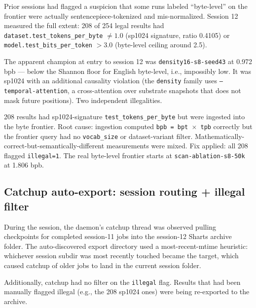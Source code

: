 Prior sessions had flagged a suspicion that some runs labeled ``byte-level'' on the frontier were actually sentencepiece-tokenized and mis-normalized. Session 12 measured the full extent: 208 of 254 legal results had \texttt{dataset.test\_tokens\_per\_byte} $\neq 1.0$ (sp1024 signature, ratio 0.4105) or \texttt{model.test\_bits\_per\_token} $> 3.0$ (byte-level ceiling around 2.5).

The apparent champion at entry to session 12 was \texttt{density16-s8-seed43} at 0.972 bpb --- below the Shannon floor for English byte-level, i.e., impossibly low. It was sp1024 with an additional causality violation (the \texttt{density} family uses \texttt{--temporal-attention}, a cross-attention over substrate snapshots that does not mask future positions). Two independent illegalities.

\begin{bug}
208 results had sp1024-signature \texttt{test\_tokens\_per\_byte} but were ingested into the byte frontier. Root cause: ingestion computed \texttt{bpb = bpt $\times$ tpb} correctly but the frontier query had no \texttt{vocab\_size} or dataset-variant filter. Mathematically-correct-but-semantically-different measurements were mixed. Fix applied: all 208 flagged \texttt{illegal=1}. The real byte-level frontier starts at \texttt{scan-ablation-s8-50k} at 1.806 bpb.
\end{bug}

\subsection{Catchup auto-export: session routing + illegal filter}

During the session, the daemon's catchup thread was observed pulling checkpoints for completed session-11 jobs into the session-12 Sharts archive folder. The auto-discovered export directory used a most-recent-mtime heuristic: whichever session subdir was most recently touched became the target, which caused catchup of older jobs to land in the current session folder.

Additionally, catchup had no filter on the \texttt{illegal} flag. Results that had been manually flagged illegal (e.g., the 208 sp1024 ones) were being re-exported to the archive.

